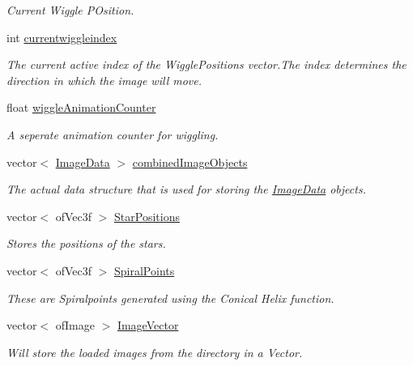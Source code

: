 \begin{DoxyCompactItemize}
\begin{DoxyCompactList}\small\item\em Current Wiggle P\-Osition. \end{DoxyCompactList}\item 
int \hyperlink{group___wiggle_ga6b9af0b1ae4a2c0530eb6a8cf8340751}{currentwiggleindex}
\begin{DoxyCompactList}\small\item\em The current active index of the Wiggle\-Positions vector.\-The index determines the direction in which the image will move. \end{DoxyCompactList}\item 
float \hyperlink{group___wiggle_ga6073b33be7847d675ec089a1d514c506}{wiggle\-Animation\-Counter}
\begin{DoxyCompactList}\small\item\em A seperate animation counter for wiggling. \end{DoxyCompactList}\item 
vector$<$ \hyperlink{struct_image_data}{Image\-Data} $>$ \hyperlink{classtest_app_aced9b8a8419c8465877c2c9cd43f8934}{combined\-Image\-Objects}
\begin{DoxyCompactList}\small\item\em The actual data structure that is used for storing the \hyperlink{struct_image_data}{Image\-Data} objects. \end{DoxyCompactList}\item 
vector$<$ of\-Vec3f $>$ \hyperlink{classtest_app_a68d0d30cea64a9d39a1b2deef16677ad}{Star\-Positions}
\begin{DoxyCompactList}\small\item\em Stores the positions of the stars. \end{DoxyCompactList}\item 
vector$<$ of\-Vec3f $>$ \hyperlink{classtest_app_af0dd2f3e3aabdb43bee49d74c156dc05}{Spiral\-Points}
\begin{DoxyCompactList}\small\item\em These are Spiralpoints generated using the Conical Helix function. \end{DoxyCompactList}\item 
vector$<$ of\-Image $>$ \hyperlink{classtest_app_ad4de5d6e6e8f3b8bb7424e62792deb1f}{Image\-Vector}
\begin{DoxyCompactList}\small\item\em Will store the loaded images from the directory in a Vector. \end{DoxyCompactList}\item 

\end{DoxyCompactItemize}

